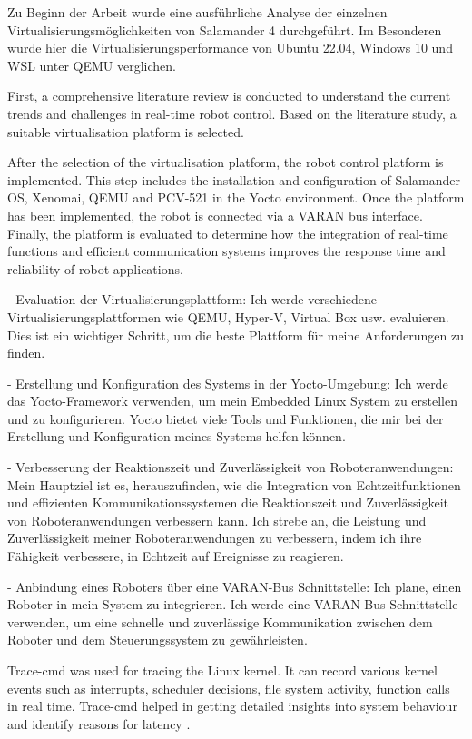 \documentclass[MMR,Master,english]{twbook}
\begin{document}
Zu Beginn der Arbeit wurde eine ausführliche Analyse der einzelnen Virtualisierungsmöglichkeiten von Salamander 4 durchgeführt. Im Besonderen wurde hier die Virtualisierungsperformance von Ubuntu 22.04, Windows 10 und WSL unter QEMU verglichen.

First, a comprehensive literature review is conducted to understand the current trends and challenges in real-time robot control. Based on the literature study, a suitable virtualisation platform is selected. 


After the selection of the virtualisation platform, the robot control platform is implemented. This step includes the installation and configuration of Salamander OS, Xenomai, QEMU and PCV-521 in the Yocto environment. Once the platform has been implemented, the robot is connected via a VARAN bus interface. Finally, the platform is evaluated to determine how the integration of real-time functions and efficient communication systems improves the response time and reliability of robot applications.

- Evaluation der Virtualisierungsplattform: 
Ich werde verschiedene Virtualisierungsplattformen wie QEMU, Hyper-V, Virtual Box usw. evaluieren. Dies ist ein wichtiger Schritt, um die beste Plattform für meine Anforderungen zu finden.
  
- Erstellung und Konfiguration des Systems in der Yocto-Umgebung: 
Ich werde das Yocto-Framework verwenden, um mein Embedded Linux System zu erstellen und zu konfigurieren. Yocto bietet viele Tools und Funktionen, die mir bei der Erstellung und Konfiguration meines Systems helfen können.

- Verbesserung der Reaktionszeit und Zuverlässigkeit von Roboteranwendungen: 
Mein Hauptziel ist es, herauszufinden, wie die Integration von Echtzeitfunktionen und effizienten Kommunikationssystemen die Reaktionszeit und Zuverlässigkeit von Roboteranwendungen verbessern kann. Ich strebe an, die Leistung und Zuverlässigkeit meiner Roboteranwendungen zu verbessern, indem ich ihre Fähigkeit verbessere, in Echtzeit auf Ereignisse zu reagieren.

- Anbindung eines Roboters über eine VARAN-Bus Schnittstelle:
Ich plane, einen Roboter in mein System zu integrieren. Ich werde eine VARAN-Bus Schnittstelle verwenden, um eine schnelle und zuverlässige Kommunikation zwischen dem Roboter und dem Steuerungssystem zu gewährleisten.

\bigskip \noindent Trace-cmd was used for tracing the Linux kernel. It can record various kernel events such as interrupts, scheduler decisions, file system activity, function calls in real time. Trace-cmd helped in getting detailed insights into system behaviour and identify reasons for latency \cite{Tracecmd}. 
\end{document}
